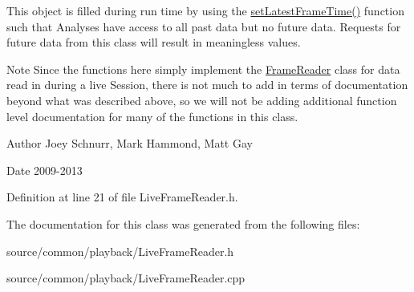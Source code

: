 This object is filled during run time by using the \hyperlink{class_picto_1_1_live_frame_reader_a34023f034855656dd54c34c331ca4e13}{set\-Latest\-Frame\-Time()} function such that Analyses have access to all past data but no future data. Requests for future data from this class will result in meaningless values. \begin{DoxyNote}{Note}
Since the functions here simply implement the \hyperlink{class_picto_1_1_frame_reader}{Frame\-Reader} class for data read in during a live Session, there is not much to add in terms of documentation beyond what was described above, so we will not be adding additional function level documentation for many of the functions in this class. 
\end{DoxyNote}
\begin{DoxyAuthor}{Author}
Joey Schnurr, Mark Hammond, Matt Gay 
\end{DoxyAuthor}
\begin{DoxyDate}{Date}
2009-\/2013 
\end{DoxyDate}


Definition at line 21 of file Live\-Frame\-Reader.\-h.



The documentation for this class was generated from the following files\-:\begin{DoxyCompactItemize}
\item 
source/common/playback/Live\-Frame\-Reader.\-h\item 
source/common/playback/Live\-Frame\-Reader.\-cpp\end{DoxyCompactItemize}
